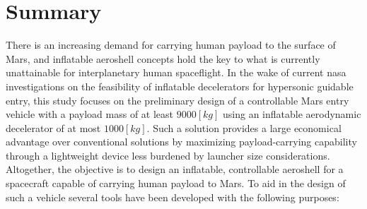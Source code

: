 \section*{Summary}\label{cha:summary}
There is an increasing demand for carrying human payload to the surface of Mars, and inflatable aeroshell concepts hold the key to what is currently unattainable for interplanetary human spaceflight. In the wake of current \acrshort{nasa} investigations on the feasibility of inflatable decelerators for hypersonic guidable entry, this study focuses on the preliminary design of a controllable Mars entry vehicle with a payload mass of at least $9000 \left[kg\right]$ using an inflatable aerodynamic decelerator of at most $1000 \left[kg\right]$. Such a solution provides a large economical advantage over conventional solutions by maximizing payload-carrying capability through a lightweight device less burdened by launcher size considerations. Altogether, the objective is to design an inflatable, controllable aeroshell for a spacecraft capable of carrying human payload to Mars.
\newline
\newline
To aid in the design of such a vehicle several tools have been developed with the following purposes:

